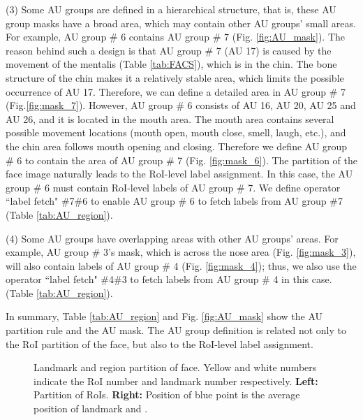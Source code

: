 \documentclass[5p,twocolumn]{elsarticle}
\makeatletter
\def\etc{etc.\@\xspace}
\makeatother
\begin{document}
(3) Some AU groups are defined in a hierarchical structure, that is, these AU group masks have a broad area, which may contain other AU groups' small areas. For example, AU group \# 6 contains AU group \# 7 (Fig. \ref{fig:AU_mask}). The reason behind such a design is that AU group \# 7 (AU 17) is caused by the movement of the mentalis (Table \ref{tab:FACS}), which is in the chin. The bone structure of the chin makes it a relatively stable area, which limits the possible occurrence of AU 17. Therefore, we can define a detailed area in AU group \# 7 (Fig.\ref{fig:mask_7}). However, AU group \# 6 consists of AU 16, AU 20, AU 25 and AU 26, and it is located in the mouth area. The mouth area contains several possible movement locations (mouth open, mouth close, smell, laugh, \etc), and the chin area follows mouth opening and closing. Therefore we define AU group \# 6 to contain the area of AU group \# 7 (Fig. \ref{fig:mask_6}). The partition of the face image naturally leads to the RoI-level label assignment. In this case, the AU group \# 6 must contain RoI-level labels of AU group \# 7. We define operator ``label fetch" \#7\#6 to enable AU group \# 6 to fetch labels from AU group \#7 (Table \ref{tab:AU_region}).

(4) Some AU groups have overlapping areas with other AU groups' areas. For example, AU group \# 3's mask, which is across the nose area (Fig. \ref{fig:mask_3}), will also contain labels of AU group \# 4 (Fig. \ref{fig:mask_4}); thus, we also use the operator ``label fetch" \#4\#3 to fetch labels from AU group \# 4 in this case. (Table \ref{tab:AU_region}).

In summary, Table \ref{tab:AU_region} and Fig. \ref{fig:AU_mask} show the AU partition rule and the AU mask. The AU group definition is related not only to the RoI partition of the face, but also to the RoI-level label assignment.


\begin{figure}[htbp]
	\begin{adjustbox}{max width=0.5\textwidth,center}
	\end{adjustbox}
	\caption{Landmark and region partition of face. Yellow and white numbers indicate the RoI number and landmark number respectively. \textbf{Left:} Partition of  RoIs. \textbf{Right:} Position of blue point is the average position of landmark  and .}
	\label{fig:ROI_face}
\end{figure}
\end{document}
